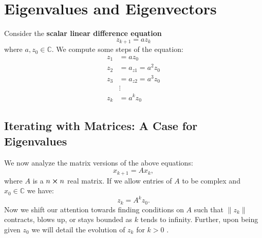 \chapter{Eigenvalues and Eigenvectors}
Consider the \textbf{scalar linear difference equation}
\[
    z_{k+1} = az_k
\]
where \(a, z_0 \in \mathbb{C}\). We compute some steps of the equation:
\begin{align*}
    z_1 &= az_0 \\
    z_2 &= a_{z1} = a^2 z_0 \\
    z_3 &= a_{z2} = a^3 z_0 \\
    &\vdots \\
    z_k &= a^k z_0
\end{align*}

\section{Iterating with Matrices: A Case for Eigenvalues}
We now analyze the matrix versions of the above equations:
\[
    x_{k+1} = Ax_k,
\]
where \(A\) is a \(n \cross n\) real matrix. If we allow entries of \(A\) to be complex and \(x_0 \in \mathbb{C}\) we have:
\[
    z_k = A^k z_0.
\]
Now we shift our attention towards finding conditions on \(A\) such that \(\lVert z_k \rVert \) contracts, blows up, or stays bounded as \(k\) tends to infinity. Further, upon being given \(z_0\) we will detail the evolution of \(z_k\) for \(k>0\) . \par

